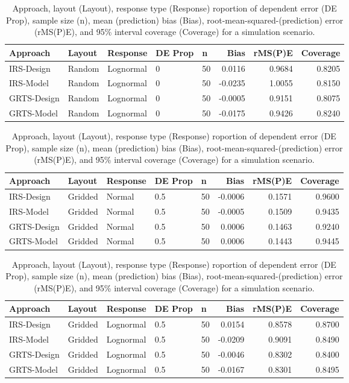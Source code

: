 \documentclass[]{elsarticle} %
\begin{document}
\begin{table}[ht]
\centering
\begin{tabular}{lllllrrr}
  \hline
Approach & Layout & Response & DE Prop & n & Bias & rMS(P)E & Coverage \\ 
  \hline
IRS-Design & Random & Lognormal & 0 & 50 & 0.0116 & 0.9684 & 0.8205 \\ 
  IRS-Model & Random & Lognormal & 0 & 50 & -0.0235 & 1.0055 & 0.8150 \\ 
  GRTS-Design & Random & Lognormal & 0 & 50 & -0.0005 & 0.9151 & 0.8075 \\ 
  GRTS-Model & Random & Lognormal & 0 & 50 & -0.0175 & 0.9426 & 0.8240 \\ 
   \hline
\end{tabular}
\caption{Approach, layout (Layout), response type (Response) roportion of dependent error (DE Prop), sample size (n), mean (prediction) bias (Bias), root-mean-squared-(prediction) error (rMS(P)E), and 95\% interval coverage (Coverage) for a simulation scenario.} 
\end{table}
\begin{table}[ht]
\centering
\begin{tabular}{lllllrrr}
  \hline
Approach & Layout & Response & DE Prop & n & Bias & rMS(P)E & Coverage \\ 
  \hline
IRS-Design & Gridded & Normal & 0.5 & 50 & -0.0006 & 0.1571 & 0.9600 \\ 
  IRS-Model & Gridded & Normal & 0.5 & 50 & -0.0005 & 0.1509 & 0.9435 \\ 
  GRTS-Design & Gridded & Normal & 0.5 & 50 & 0.0006 & 0.1463 & 0.9240 \\ 
  GRTS-Model & Gridded & Normal & 0.5 & 50 & 0.0006 & 0.1443 & 0.9445 \\ 
   \hline
\end{tabular}
\caption{Approach, layout (Layout), response type (Response) roportion of dependent error (DE Prop), sample size (n), mean (prediction) bias (Bias), root-mean-squared-(prediction) error (rMS(P)E), and 95\% interval coverage (Coverage) for a simulation scenario.} 
\end{table}
\begin{table}[ht]
\centering
\begin{tabular}{lllllrrr}
  \hline
Approach & Layout & Response & DE Prop & n & Bias & rMS(P)E & Coverage \\ 
  \hline
IRS-Design & Gridded & Lognormal & 0.5 & 50 & 0.0154 & 0.8578 & 0.8700 \\ 
  IRS-Model & Gridded & Lognormal & 0.5 & 50 & -0.0209 & 0.9091 & 0.8490 \\ 
  GRTS-Design & Gridded & Lognormal & 0.5 & 50 & -0.0046 & 0.8302 & 0.8400 \\ 
  GRTS-Model & Gridded & Lognormal & 0.5 & 50 & -0.0167 & 0.8301 & 0.8495 \\ 
   \hline
\end{tabular}
\caption{Approach, layout (Layout), response type (Response) roportion of dependent error (DE Prop), sample size (n), mean (prediction) bias (Bias), root-mean-squared-(prediction) error (rMS(P)E), and 95\% interval coverage (Coverage) for a simulation scenario.} 
\end{table}
\end{document}
